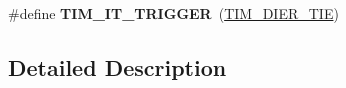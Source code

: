 \begin{DoxyCompactItemize}
\item 
\hypertarget{group___t_i_m___interrupt__definition_ga2a577f2eee61f101cf551d86c4d73333}{\#define {\bfseries T\-I\-M\-\_\-\-I\-T\-\_\-\-T\-R\-I\-G\-G\-E\-R}~(\hyperlink{group___peripheral___registers___bits___definition_gaa755fef2c4e96c63f2ea1cd9a32f956a}{T\-I\-M\-\_\-\-D\-I\-E\-R\-\_\-\-T\-I\-E})}\label{group___t_i_m___interrupt__definition_ga2a577f2eee61f101cf551d86c4d73333}

\end{DoxyCompactItemize}


\subsection{Detailed Description}
